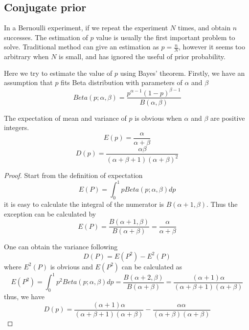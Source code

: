 \documentclass[a4paper]{article}
\begin{document}
\subsection{Conjugate prior}

In a Bernoulli experiment, if we repeat the experiment $N$ times, and obtain $n$ successes.
The estimation of $p$ value is usually the first important problem to solve.
Traditional method can give an estimation as $\hat{p}=\frac{n}{N}$, however it seems too arbitrary when $N$ is small, and has ignored the useful of prior probability.

Here we try to estimate the value of $p$ using Bayes' theorem.
Firstly, we have an assumption that $p$ fits Beta distribution with parameters of $\alpha$ and $\beta$
\begin{equation}
    Beta(p; \alpha, \beta) = \frac{p^{\alpha-1} (1-p)^{\beta-1}}{B(\alpha, \beta)}
\end{equation}

The expectation of mean and variance of $p$ is obvious when $\alpha$ and $\beta$ are positive integers.
\begin{equation}
    E(p) = \frac{\alpha}{\alpha+\beta}
\end{equation}
\begin{equation}
    D(p) = \frac{\alpha\beta}{(\alpha+\beta+1)(\alpha+\beta)^2}
\end{equation}


\begin{proof}
    Start from the definition of expectation
    \begin{equation*}
        E(P) = \int_{0}^{1} p Beta(p; \alpha, \beta) dp
    \end{equation*}
    it is easy to calculate the integral of the numerator is $B(\alpha+1, \beta)$.
    Thus the exception can be calculated by
    \begin{equation*}
        E(P) = \frac{B(\alpha+1, \beta)}{B(\alpha+\beta)} = \frac{\alpha}{\alpha+\beta}
    \end{equation*}

    One can obtain the variance following
    \begin{equation*}
        D(P) = E(P^{2}) - E^{2}(P)
    \end{equation*}
    where $E^{2}(P)$ is obvious and $E(P^{2})$ can be calculated as
    \begin{equation*}
        E(P^{2}) = \int_{0}^{1} p^{2} Beta(p; \alpha, \beta) dp = \frac{B(\alpha+2, \beta)}{B(\alpha+\beta)} = \frac{(\alpha+1)\alpha}{(\alpha+\beta+1)(\alpha+\beta)}
    \end{equation*}
    thus, we have
    \begin{equation*}
        D(p) = \frac{(\alpha+1)\alpha}{(\alpha+\beta+1)(\alpha+\beta)} - \frac{\alpha\alpha}{(\alpha+\beta)(\alpha+\beta)}
    \end{equation*}

\end{proof}
\end{document}
